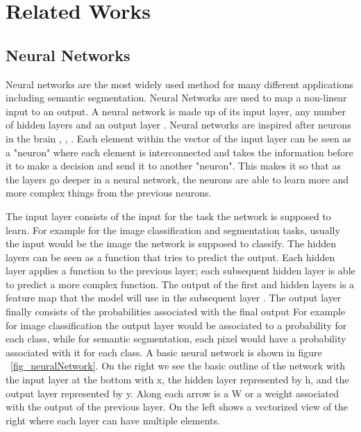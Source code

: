 \chapter{Related Works}


\section{Neural Networks}
    Neural networks are the most widely used method for many different applications including semantic segmentation. 
    Neural Networks are used to map a non-linear input to an output. 
    A neural network is made up of its input layer, any number of hidden layers and an output layer \cite{DeepLearning2015}.
    Neural networks are inspired after neurons in the brain \cite{DeepLearning2015}, \cite{Goodfellow-et-al-2016}, \cite{10.1371/journal.pcbi.Neurons}. 
    Each element within the vector of the input layer can be seen as a "neuron" where each element is interconnected and takes the information before it to make a decision and send it to another "neuron".
    This makes it so that as the layers go deeper in a neural network, the neurons are able to learn more and more complex things from the previous neurons.
    \par
    The input layer consists of the input for the task the network is supposed to learn. 
    For example for the image classification and segmentation tasks, usually the input would be the image the network is supposed to classify. 
    The hidden layers can be seen as a function that tries to predict the output. 
    Each hidden layer applies a function to the previous layer; each subsequent hidden layer is able to predict a more complex function.
    The output of the first and hidden layers is a feature map that the model will use in the subsequent layer \cite{Goodfellow-et-al-2016}. 
    The output layer finally consists of the probabilities associated with the final output 
    For example for image classification the output layer would be associated to a probability for each class, while for semantic segmentation, each pixel would have a probability associated with it for each class. 
    A basic neural network is shown in figure ~\ref{fig_neuralNetwork}. On the right we see the basic outline of the network with the input layer at the bottom with x, the hidden layer represented by h, and the output layer represented by y. Along each arrow is a W or a weight associated with the output of the previous layer. On the left shows a vectorized view of the right where each layer can have multiple elements.
    
